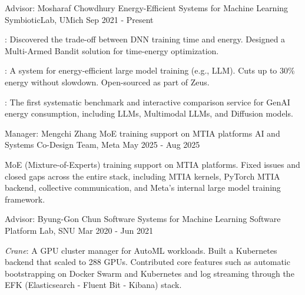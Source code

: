 

\begin{cventries}

  \cventryexp
    {Advisor: Mosharaf Chowdhury}
    {Energy-Efficient Systems for Machine Learning}
    {SymbioticLab, UMich}
    {Sep 2021 - Present}
    {
      \begin{cvitems}
        \item {\href{https://ml.energy/zeus}{}: Discovered the trade-off between DNN training time and energy. Designed a Multi-Armed Bandit solution for time-energy optimization.}
        \item {\href{https://ml.energy/zeus/research\_overview/perseus}{}: A system for energy-efficient large model training (e.g., LLM). Cuts up to 30\% energy without slowdown. Open-sourced as part of Zeus.}
        \item {\href{https://ml.energy/leaderboard}{}: The first systematic benchmark and interactive comparison service for GenAI energy consumption, including LLMs, Multimodal LLMs, and Diffusion models.}
      \end{cvitems}
    }
    
  \cventryexp
    {Manager: Mengchi Zhang}
    {MoE training support on MTIA platforms}
    {AI and Systems Co-Design Team, Meta}
    {May 2025 - Aug 2025}
    {
      \begin{cvitems}
        \item {MoE (Mixture-of-Experts) training support on MTIA platforms. Fixed issues and closed gaps across the entire stack, including MTIA kernels, PyTorch MTIA backend, collective communication, and Meta's internal large model training framework.}
      \end{cvitems}
    }
    
  \cventryexp
    {Advisor: Byung-Gon Chun}
    {Software Systems for Machine Learning}
    {Software Platform Lab, SNU}
    {Mar 2020 - Jun 2021}
    {
      \begin{cvitems}
        \item {\textit{Crane}: A GPU cluster manager for AutoML workloads. Built a Kubernetes backend that scaled to 288 GPUs. Contributed core features such as automatic bootstrapping on Docker Swarm and Kubernetes and log streaming through the EFK (Elasticsearch - Fluent Bit - Kibana) stack.}
      \end{cvitems}
    }
    

\end{cventries}

